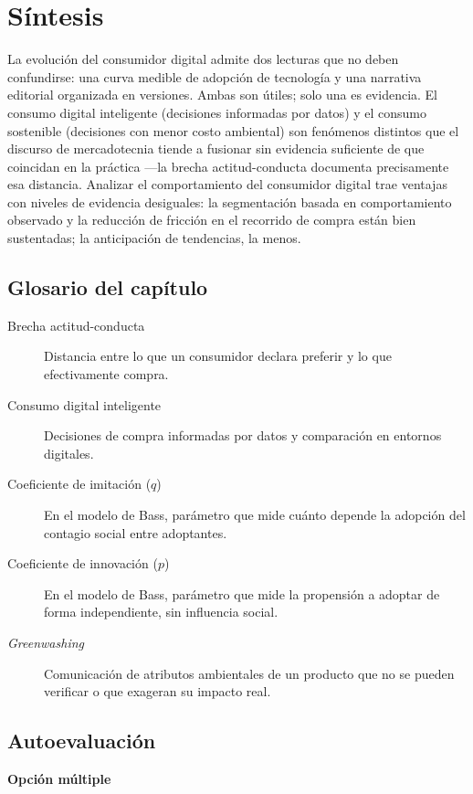 \section{Síntesis}

La evolución del consumidor digital admite dos lecturas que no deben
confundirse: una curva medible de adopción de tecnología y una narrativa
editorial organizada en versiones. Ambas son útiles; solo una es evidencia.
El consumo digital inteligente (decisiones informadas por datos) y el consumo
sostenible (decisiones con menor costo ambiental) son fenómenos distintos que
el discurso de mercadotecnia tiende a fusionar sin evidencia suficiente de
que coincidan en la práctica —la brecha actitud-conducta documenta
precisamente esa distancia. Analizar el comportamiento del consumidor digital
trae ventajas con niveles de evidencia desiguales: la segmentación basada en
comportamiento observado y la reducción de fricción en el recorrido de compra
están bien sustentadas; la anticipación de tendencias, la menos.

\subsection*{Glosario del capítulo}
\begin{description}
  \item[Brecha actitud-conducta] Distancia entre lo que un consumidor declara
  preferir y lo que efectivamente compra.
  \item[Consumo digital inteligente] Decisiones de compra informadas por
  datos y comparación en entornos digitales.
  \item[Coeficiente de imitación ($q$)] En el modelo de Bass, parámetro que
  mide cuánto depende la adopción del contagio social entre adoptantes.
  \item[Coeficiente de innovación ($p$)] En el modelo de Bass, parámetro que
  mide la propensión a adoptar de forma independiente, sin influencia social.
  \item[\textit{Greenwashing}] Comunicación de atributos ambientales de un
  producto que no se pueden verificar o que exageran su impacto real.
\end{description}

\subsection*{Autoevaluación}

\textbf{Opción múltiple}

